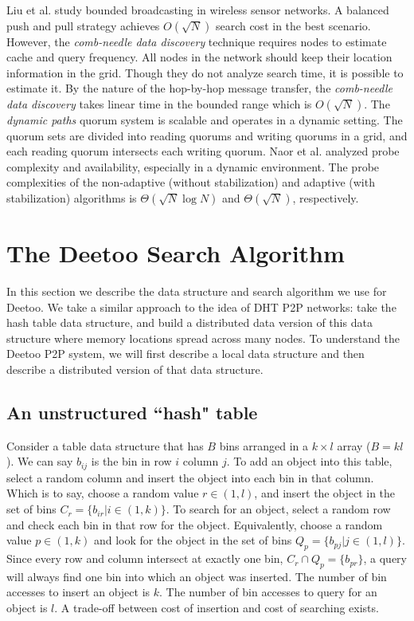Liu et al. \cite{LiuHZ04} study bounded broadcasting in wireless sensor networks. 
A balanced push and pull strategy achieves $O(\sqrt N)$ search 
cost in the best scenario. However, the \emph{comb-needle data discovery} technique 
requires nodes to estimate cache and query frequency.
All nodes in the network should keep their location information in the grid. 
Though they do not analyze search time, it is possible to estimate it. By the
nature of the hop-by-hop message transfer, the \emph{comb-needle data discovery} 
takes linear time in the bounded range which is $O(\sqrt N)$. 
The \emph{dynamic paths} quorum system\cite{Naor05} 
is scalable and operates in a dynamic setting. The quorum sets are 
divided into reading quorums and writing quorums in a grid, and each 
reading quorum intersects each writing quorum. Naor et al. analyzed probe 
complexity and availability, especially in a dynamic environment. 
The probe complexities of the non-adaptive (without stabilization)
and adaptive (with stabilization) algorithms is 
$\Theta(\sqrt N \log N)$ and $\Theta(\sqrt N)$, respectively. 


\section{The Deetoo Search Algorithm}\label{sec:model}
In this section we describe the data structure and search algorithm
we use for Deetoo.  We take a similar approach to the idea of DHT P2P networks: take the hash table
data structure, and build a distributed data version of this data structure
where memory locations spread across many nodes.  
To understand the Deetoo P2P system, we will first describe a local
data structure and then describe a distributed version of that data structure.

\subsection{An unstructured ``hash" table}
\label{sec:localtab}

Consider a table data structure that has $B$ bins arranged in a $k\times l$
array ($B=kl$).  We can say $b_{ij}$ is the bin in row $i$ column $j$.  To add an
object into this table, select a random column and insert the object into each
bin in that column.  Which is to say, choose a random value $r\in (1,l)$,
and insert the object in the set of bins $C_r = \{b_{ir} | i \in (1,k)\}$.
To search for an object, select a random row and check each bin in that
row for the
object.  Equivalently, choose a random value $p \in (1,k)$ and look
for the object in the set of bins $Q_p = \{b_{pj} | j \in (1,l)\}$.  Since
every row and column intersect at exactly one bin, $C_r \cap Q_p = \{b_{pr}\}$,
a query will always find
one bin into which an object was inserted.  The number of bin accesses to
insert an object is $k$.  The number of bin accesses to query for an object is
$l$.  A trade-off between cost of insertion and cost of searching exists.

